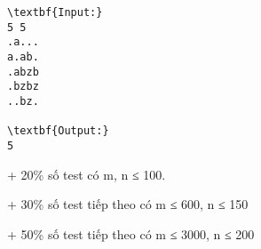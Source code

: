 \begin{verbatim}
\textbf{Input:}
5 5
.a...
a.ab.
.abzb
.bzbz
..bz.

\textbf{Output:}
5
\end{verbatim}
+ 20\% số test có m, n ≤ 100.

+ 30\% số test tiếp theo có m ≤ 600, n ≤ 150

+ 50\% số test tiếp theo có m ≤ 3000, n ≤ 200 \textbf{}